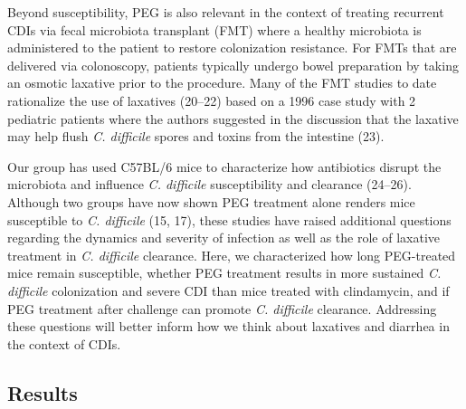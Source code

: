 \documentclass[
  11pt,
]{article}
\begin{document}
Beyond susceptibility, PEG is also relevant in the context of treating
recurrent CDIs via fecal microbiota transplant (FMT) where a healthy
microbiota is administered to the patient to restore colonization
resistance. For FMTs that are delivered via colonoscopy, patients
typically undergo bowel preparation by taking an osmotic laxative prior
to the procedure. Many of the FMT studies to date rationalize the use of
laxatives (20--22) based on a 1996 case study with 2 pediatric patients
where the authors suggested in the discussion that the laxative may help
flush \emph{C. difficile} spores and toxins from the intestine (23).

Our group has used C57BL/6 mice to characterize how antibiotics disrupt
the microbiota and influence \emph{C. difficile} susceptibility and
clearance (24--26). Although two groups have now shown PEG treatment
alone renders mice susceptible to \emph{C. difficile} (15, 17), these
studies have raised additional questions regarding the dynamics and
severity of infection as well as the role of laxative treatment in
\emph{C. difficile} clearance. Here, we characterized how long
PEG-treated mice remain susceptible, whether PEG treatment results in
more sustained \emph{C. difficile} colonization and severe CDI than mice
treated with clindamycin, and if PEG treatment after challenge can
promote \emph{C. difficile} clearance. Addressing these questions will
better inform how we think about laxatives and diarrhea in the context
of CDIs.

\hypertarget{results}{%
\subsection{Results}\label{results}}
\end{document}
